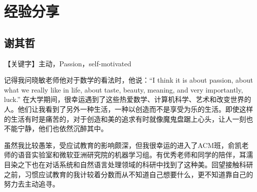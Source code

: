 \documentclass{vivid_layout}
\begin{document}
\begin{comment}
\subsection{如何处理生活和工作的平衡的？}
包括恋爱：如何均衡恋爱与学习？恋爱会影响学习吗？面对异地恋要怎么办？
\begin{itemize}
\item {\name 12 陈思奇}\quad  1.分手；2.坚持很久以后再分手；3.把女友接到异国；4.柏拉图式恋爱
\item  {\name 05 刘畅}  \quad 恋爱两个人会有一段时间是想要腻在一起的，这段时间可能会影响。如果两个人到了平淡期，意识到两个人都有工作要做就好了。如果可以一个月见面4次的话我觉得还好。否则就需要考虑一下怎么改变现状.
\item  {\name 02 杨林骥}  \quad 不谈 影响 但是会后悔
\item  {\name 12 谢其哲}  \quad 没恋爱的时候主要跟同学朋友玩，恋爱了以后就要陪女朋友玩了，人不可能不玩，所以恋爱可以不影响学习。如果两个人能忍受异地恋能耐得住寂寞，其实并不会导致分手，两个人对于未来的规划不一致才会，比如如果一个人一定要呆在国内，另一个人想在国外，不确定什么时候回国，就很可能分手。
\end{itemize}
\end{comment}



\section{经验分享}
\addtocounter{section}{1}
\setcounter{subsection}{0}

\subsection{{ 谢其哲}}

【关键字】主动，Passion，self-motivated

记得我问晓敏老师他对于数学的看法时，他说：“I think it is about passion, about what we really like in life, about taste, beauty, meaning, and very importantly, luck.” 在大学期间，很幸运遇到了这些热爱数学、计算机科学、艺术和改变世界的人。他们让我看到了另外一种生活，一种以创造而不是享受为乐的生活。即使这样的生活有时是痛苦的，对于创造和美的追求有时就像魔鬼盘踞上心头，让人一刻也不能宁静，他们也依然沉醉其中。

虽然我比较愚笨，受应试教育的影响颇深，但我很幸运的进入了ACM班，俞凯老师的语音实验室和微软亚洲研究院的机器学习组。有优秀老师和同学的陪伴，耳濡目染之下也在对话系统和自然语言处理领域的科研中找到了这种美。回望接触科研之前，习惯应试教育的我计较着分数而从不知道自己想要什么，更不知道靠自己的努力去主动追寻。
\end{document}
